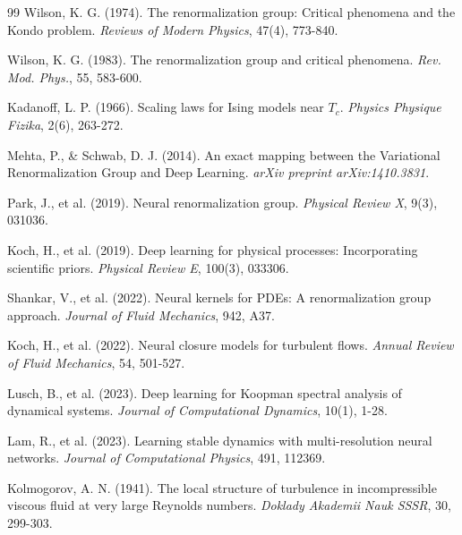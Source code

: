 \documentclass[12pt,a4paper,twoside]{article}
\begin{document}
\begin{inversation}
\begin{thebibliography}{99}
\vspace{0.2cm}
\noindent[23] Wilson, K. G. (1974). The renormalization group: Critical phenomena and the Kondo problem. \textit{Reviews of Modern Physics}, 47(4), 773-840.

\vspace{0.2cm}
\noindent[24] Wilson, K. G. (1983). The renormalization group and critical phenomena. \textit{Rev. Mod. Phys.}, 55, 583-600.

\vspace{0.2cm}
\noindent[25] Kadanoff, L. P. (1966). Scaling laws for Ising models near $T_c$. \textit{Physics Physique Fizika}, 2(6), 263-272.

\vspace{0.2cm}
\noindent[26] Mehta, P., \& Schwab, D. J. (2014). An exact mapping between the Variational Renormalization Group and Deep Learning. \textit{arXiv preprint arXiv:1410.3831}.

\vspace{0.2cm}
\noindent[27] Park, J., et al. (2019). Neural renormalization group. \textit{Physical Review X}, 9(3), 031036.

\vspace{0.2cm}
\noindent[28] Koch, H., et al. (2019). Deep learning for physical processes: Incorporating scientific priors. \textit{Physical Review E}, 100(3), 033306.

\vspace{0.2cm}
\noindent[29] Shankar, V., et al. (2022). Neural kernels for PDEs: A renormalization group approach. \textit{Journal of Fluid Mechanics}, 942, A37.

\vspace{0.2cm}
\noindent[30] Koch, H., et al. (2022). Neural closure models for turbulent flows. \textit{Annual Review of Fluid Mechanics}, 54, 501-527.

\vspace{0.2cm}
\noindent[31] Lusch, B., et al. (2023). Deep learning for Koopman spectral analysis of dynamical systems. \textit{Journal of Computational Dynamics}, 10(1), 1-28.

\vspace{0.2cm}
\noindent[32] Lam, R., et al. (2023). Learning stable dynamics with multi-resolution neural networks. \textit{Journal of Computational Physics}, 491, 112369.

\vspace{0.2cm}
\noindent[33] Kolmogorov, A. N. (1941). The local structure of turbulence in incompressible viscous fluid at very large Reynolds numbers. \textit{Doklady Akademii Nauk SSSR}, 30, 299-303.


\end{thebibliography}
\end{inversation}
\end{document}
